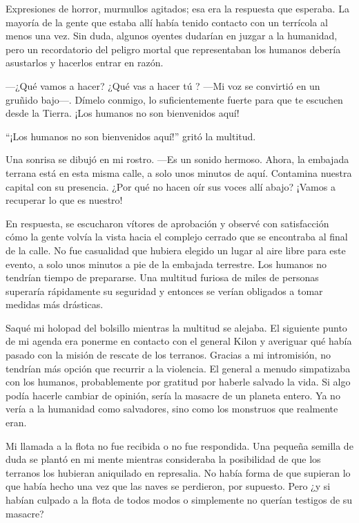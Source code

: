     Expresiones de horror, murmullos agitados; esa era la respuesta que esperaba. La mayoría de la gente que estaba allí había tenido contacto con un terrícola al menos una vez. Sin duda, algunos oyentes dudarían en juzgar a la humanidad, pero un recordatorio del peligro mortal que representaban los humanos debería asustarlos y hacerlos entrar en razón.

    —¿Qué vamos a hacer? ¿Qué vas a hacer tú ? —Mi voz se convirtió en un gruñido bajo—. Dímelo conmigo, lo suficientemente fuerte para que te escuchen desde la Tierra. ¡Los humanos no son bienvenidos aquí!

    ``¡Los humanos no son bienvenidos aquí!''
 gritó la multitud.

    Una sonrisa se dibujó en mi rostro. —Es un sonido hermoso. Ahora, la embajada terrana está en esta misma calle, a solo unos minutos de aquí. Contamina nuestra capital con su presencia. ¿Por qué no hacen oír sus voces allí abajo? ¡Vamos a recuperar lo que es nuestro!

    En respuesta, se escucharon vítores de aprobación y observé con satisfacción cómo la gente volvía la vista hacia el complejo cerrado que se encontraba al final de la calle. No fue casualidad que hubiera elegido un lugar al aire libre para este evento, a solo unos minutos a pie de la embajada terrestre. Los humanos no tendrían tiempo de prepararse. Una multitud furiosa de miles de personas superaría rápidamente su seguridad y entonces se verían obligados a tomar medidas más drásticas.

    Saqué mi holopad del bolsillo mientras la multitud se alejaba. El siguiente punto de mi agenda era ponerme en contacto con el general Kilon y averiguar qué había pasado con la misión de rescate de los terranos. Gracias a mi intromisión, no tendrían más opción que recurrir a la violencia. El general a menudo simpatizaba con los humanos, probablemente por gratitud por haberle salvado la vida. Si algo podía hacerle cambiar de opinión, sería la masacre de un planeta entero. Ya no vería a la humanidad como salvadores, sino como los monstruos que realmente eran.

    Mi llamada a la flota no fue recibida o no fue respondida. Una pequeña semilla de duda se plantó en mi mente mientras consideraba la posibilidad de que los terranos los hubieran aniquilado en represalia. No había forma de que supieran lo que había hecho una vez que las naves se perdieron, por supuesto. Pero ¿y si habían culpado a la flota de todos modos o simplemente no querían testigos de su masacre?

